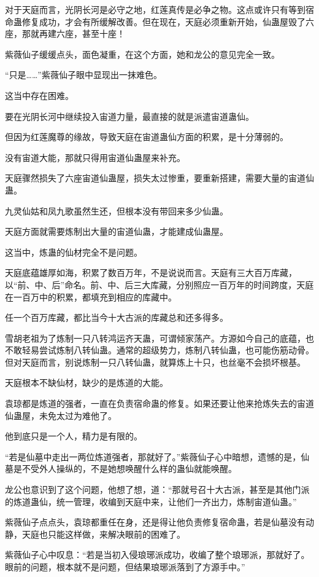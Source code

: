 \begin{this_body}
对于天庭而言，光阴长河是必守之地，红莲真传是必争之物。这点或许只有等到宿命蛊修复成功，才会有所缓解改善。但在现在，天庭必须重新开始，仙蛊屋毁了六座，那就再建六座，甚至十座！

紫薇仙子缓缓点头，面色凝重，在这个方面，她和龙公的意见完全一致。

“只是……”紫薇仙子眼中显现出一抹难色。

这当中存在困难。

要在光阴长河中继续投入宙道力量，最直接的就是派遣宙道蛊仙。

但因为红莲魔尊的缘故，导致天庭在宙道蛊仙方面的积累，是十分薄弱的。

没有宙道大能，那就只得用宙道仙蛊屋来补充。

天庭骤然损失了六座宙道仙蛊屋，损失太过惨重，要重新搭建，需要大量的宙道仙蛊。

九灵仙姑和凤九歌虽然生还，但根本没有带回来多少仙蛊。

天庭方面就需要炼制出大量的宙道仙蛊，才能建成仙蛊屋。

这当中，炼蛊的仙材完全不是问题。

天庭底蕴雄厚如海，积累了数百万年，不是说说而言。天庭有三大百万库藏，以“前、中、后”命名。前、中、后三大库藏，分别照应一百万年的时间跨度，天庭在一百万中的积累，都填充到相应的库藏中。

任一个百万库藏，都比当今十大古派的库藏总和还多得多。

雪胡老祖为了炼制一只八转鸿运齐天蛊，可谓倾家荡产。方源如今自己的底蕴，也不敢轻易尝试炼制八转仙蛊。通常的超级势力，炼制八转仙蛊，也可能伤筋动骨。但对天庭而言，别说炼制一只八转仙蛊，就算炼上十只，也丝毫不会损坏根基。

天庭根本不缺仙材，缺少的是炼道的大能。

袁琼都是炼道的强者，一直在负责宿命蛊的修复。如果还要让他来抢炼失去的宙道仙蛊屋，未免太过为难他了。

他到底只是一个人，精力是有限的。

“若是仙墓中走出一两位炼道强者，那就好了。”紫薇仙子心中暗想，遗憾的是，仙墓是不受外人操纵的，不是她想唤醒什么样的蛊仙就能唤醒。

龙公也意识到了这个问题，他想了想，道：“那就号召十大古派，甚至是其他门派的炼道蛊仙，统一管理，收编到天庭中来，让他们一齐出力，炼制宙道仙蛊。”

紫薇仙子点点头，袁琼都重任在身，还是得让他负责修复宿命蛊，若是仙墓没有动静，天庭也只能这样做，来解决眼前的困难了。

紫薇仙子心中叹息：“若是当初入侵琅琊派成功，收编了整个琅琊派，那就好了。眼前的问题，根本就不是问题，但结果琅琊派落到了方源手中。”


\end{this_body}
